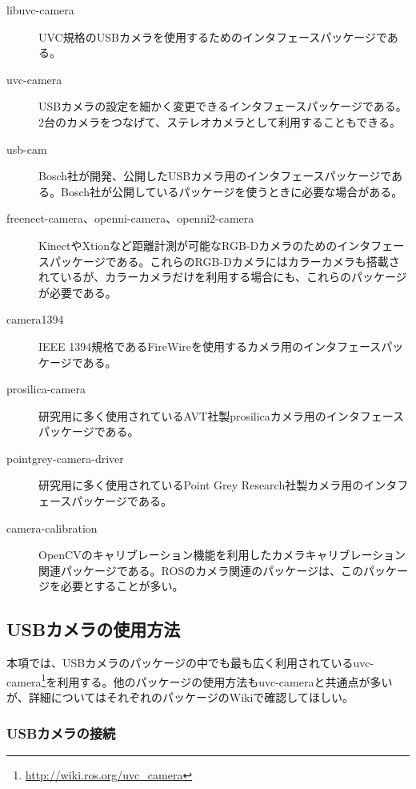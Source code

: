 \vspace{\baselineskip}
\noindent
\begin{description}
\item[libuvc-camera] UVC規格のUSBカメラを使用するためのインタフェースパッケージである。
\item[uvc-camera] USBカメラの設定を細かく変更できるインタフェースパッケージである。2台のカメラをつなげて、ステレオカメラとして利用することもできる。
\item[usb-cam] Bosch社が開発、公開したUSBカメラ用のインタフェースパッケージである。Bosch社が公開しているパッケージを使うときに必要な場合がある。
\item[freenect-camera、openni-camera、openni2-camera] KinectやXtionなど距離計測が可能なRGB-Dカメラのためのインタフェースパッケージである。これらのRGB-Dカメラにはカラーカメラも搭載されているが、カラーカメラだけを利用する場合にも、これらのパッケージが必要である。
\item[camera1394] IEEE 1394規格であるFireWireを使用するカメラ用のインタフェースパッケージである。
\item[prosilica-camera] 研究用に多く使用されているAVT社製prosilicaカメラ用のインタフェースパッケージである。
\item[pointgrey-camera-driver] 研究用に多く使用されているPoint Grey Research社製カメラ用のインタフェースパッケージである。
\item[camera-calibration] OpenCVのキャリブレーション機能を利用したカメラキャリブレーション関連パッケージである。ROSのカメラ関連のパッケージは、このパッケージを必要とすることが多い。
\end{description}

\subsection{USBカメラの使用方法}

本項では、USBカメラのパッケージの中でも最も広く利用されているuvc-camera\footnote{\url{http://wiki.ros.org/uvc\_camera}}を利用する。他のパッケージの使用方法もuvc-cameraと共通点が多いが、詳細についてはそれぞれのパッケージのWikiで確認してほしい。

\subsubsection{USBカメラの接続}

